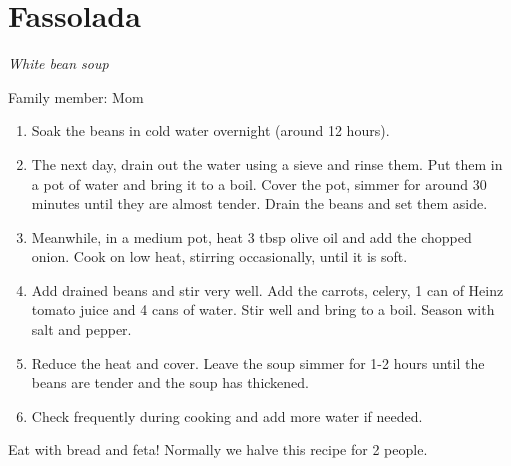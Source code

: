 \chapter{Fassolada}
\label{ch:fassolada}


\textit{White bean soup}

Family member: Mom

\begin{enumerate}
    \item Soak the beans in cold water overnight (around 12 hours).
    \item The next day, drain out the water using a sieve and rinse them. Put them in a pot of water and bring it to a boil. Cover the pot, simmer for around 30 minutes until they are almost tender. Drain the beans and set them aside.
    \item Meanwhile, in a medium pot, heat 3 tbsp olive oil and add the chopped onion. Cook on low heat, stirring occasionally, until it is soft.
    \item Add drained beans and stir very well. Add the carrots, celery, 1 can of Heinz tomato juice and 4 cans of water. Stir well and bring to a boil. Season with salt and pepper.
    \item Reduce the heat and cover. Leave the soup simmer for 1-2 hours until the beans are tender and the soup has thickened.
    \item Check frequently during cooking and add more water if needed.
\end{enumerate}

Eat with bread and feta! Normally we halve this recipe for 2 people.
